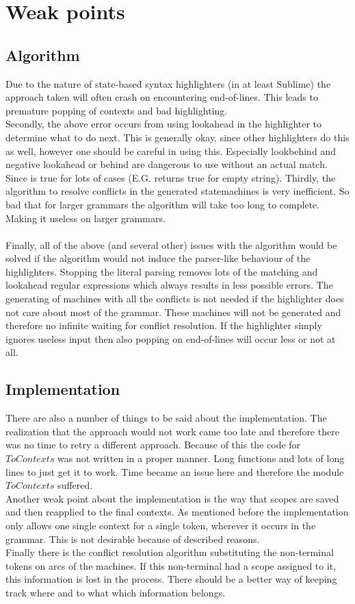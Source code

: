 \pagebreak
\section{Weak points}
\subsection{Algorithm}
Due to the nature of state-based syntax highlighters (in at least Sublime) the approach taken will often crash on encountering end-of-lines. This leads to premature popping of contexts and bad highlighting.\\
Secondly, the above error occurs from using lookahead in the highlighter to determine what to do next. This is generally okay, since other highlighters do this as well, however one should be careful in using this. Especially lookbehind and negative lookahead or behind are dangerous to use without an actual match. Since  is true for lots of cases (E.G.  returns true for empty string). 
Thirdly, the algorithm to resolve conflicts in the generated statemachines is very inefficient. So bad that for larger grammars the algorithm will take too long to complete. Making it useless on larger grammars.\\\\
Finally, all of the above (and several other) issues with the algorithm would be solved if the algorithm would not induce the parser-like behaviour of the highlighters. Stopping the literal parsing removes lots of the matching and lookahead regular expressions which always results in less possible errors. The generating of machines with all the conflicts is not needed if the highlighter does not care about most of the grammar. These machines will not be generated and therefore no infinite waiting for conflict resolution. If the highlighter simply ignores useless input then also popping on end-of-lines will occur less or not at all.

\subsection{Implementation}
There are also a number of things to be said about the implementation. The realization that the approach would not work came too late and therefore there was no time to retry a different approach. Because of this the code for $ToContexts$ was not written in a proper manner. Long functions and lots of long lines to just get it to work. Time became an issue here and therefore the module $ToContexts$ suffered.\\
Another weak point about the implementation is the way that scopes are saved and then reapplied to the final contexts. As mentioned before the implementation only allows one single context for a single token, wherever it occurs in the grammar. This is not desirable because of described reasons.\\
Finally there is the conflict resolution algorithm substituting the non-terminal tokens on arcs of the machines. If this non-terminal had a scope assigned to it, this information is lost in the process. There should be a better way of keeping track where and to what which information belongs.

